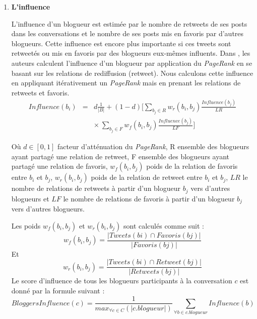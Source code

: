\documentclass{article-hermes}
\begin{document}
\begin{enumerate}
\item  \textbf{L'influence}
\par L'influence d'un blogueur est estimée par le nombre de retweets de ses posts dans les conversations et le nombre de ses posts mis en favoris par d'autres blogueurs. Cette influence est encore plus importante si ces tweets sont retweetés ou mis en favoris par des blogueurs eux-mêmes influents. Dans \cite{lamjedmarami}, les auteurs calculent l'influence d'un blogueur par application du \textit{PageRank} en se basant sur les relations de rediffusion (retweet). Nous calculons cette influence en appliquant itérativement un \textit{PageRank} mais en prenant les relations de retweets et favoris.
\begin{eqnarray}
\label{eq:blogerquality}
Influence(b_{i}) &=& d \frac{1}{|B|} + (1-d)\Bigg [ \sum_{b_j\in R} w_{r}(b_i,b_j)\frac{Influence(b_{j})}{LR}\nonumber\\ 
&& \times ~\sum_{b_j\in F} w_{f}(b_i,b_j)\frac{Influence(b_{j})}{LF} \Bigg ] 
\end{eqnarray}
\par Où $d\in[0,1]$ facteur d'atténuation du \textit{PageRank}, R ensemble des blogueurs ayant partagé une relation de retweet, F ensemble des blogueurs ayant partagé une relation de favoris, $w_{f}(b_i,b_j)$ poids de la relation de favoris entre $b_i$ et $b_j$, $w_{r}(b_i,b_j)$ poids de la relation de retweet entre $b_i$ et $b_j$, $LR$ le nombre de relations de retweets à partir d'un blogueur $b_j$ vers d'autres blogueurs et $LF$ le nombre de relations de favoris à partir d'un blogueur $b_j$ vers d'autres blogueurs.
\par Les poids $w_{f}(b_i,b_j)$ et $w_{r}(b_i,b_j)$ sont calculés comme suit : 
\begin{equation}
w_{f}(b_i,b_j) = \frac{|Tweets(bi) \cap Favoris(bj)| }{ |Favoris(bj)|}
\end{equation}
Et 
\begin{equation}
w_{r}(b_i,b_j) = \frac{|Tweets(bi) \cap Retweet(bj)| }{ |Retweets(bj)|}
\end{equation}
Le score d'influence de tous les blogueurs participants à la conversation $c$ est donné par la formule suivant :
\begin{equation}
BloggersInfluence(c)  = \frac{1}{max_{\forall{c\in C}} ( |c.blogueur|)}  \sum_{\forall{b \in c.blogueur}} Influence(b)
\end{equation}
\end{enumerate} 
\end{document}
